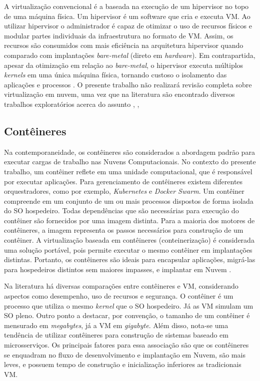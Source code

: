 A virtualização convencional é a baseada na execução de um hipervisor no topo de uma máquina física. Um hipervisor é um software que cria e executa \ac{VM}. Ao utilizar hipervisor o administrador é capaz de otimizar o uso de recursos físicos e modular partes individuais da infraestrutura no formato de \ac{VM}. Assim, os recursos são consumidos com mais eficiência na arquitetura hipervisor quando comparado com implantações \textit{bare-metal} (direto em \textit{hardware}). Em contrapartida, apesar da otimização em relação ao \textit{bare-metal}, o hipervisor executa múltiplos \textit{kernels} em uma única máquina física, tornando custoso o isolamento das aplicações e processos \cite{scheepers2014virtualization}.
%
O presente trabalho não realizará revisão completa sobre virtualização em nuvem, uma vez que na literatura são encontrado diversos trabalhos exploratórios acerca do assunto \cite{Assuno}, \cite{lu2014cloud}, \cite{aceto2013cloud}

\subsection{Contêineres}
Na contemporaneidade, os contêineres são considerados a abordagem padrão para executar cargas de trabalho nas Nuvens Computacionais. No contexto do presente trabalho, um contêiner reflete em uma unidade computacional, que é responsável por executar aplicações. Para gerenciamento de contêineres existem diferentes orquestradores, como por exemplo, \textit{Kubernetes} e \textit{Docker Swarm}.
%
Um contêiner compreende em um conjunto de um ou mais processos dispostos de forma isolada do \ac{SO} hospedeiro. Todas dependências que são necessárias para execução do contêiner são fornecidos por uma imagem distinta. Para a maioria dos motores de contêineres, a imagem representa os passos necessários para construção de um contêiner. A virtualização baseada em contêineres (conteinerização) é considerada uma solução portável, pois permite executar o mesmo contêiner em implantações distintas. Portanto, os contêineres são ideais para encapsular aplicações, migrá-las para hospedeiros distintos sem maiores impasses, e implantar em Nuvem \cite{Redhat-lxc}.

Na literatura há diversas comparações entre contêineres e \ac{VM}, considerando aspectos como desempenho, uso de recursos e segurança. O contêiner é um processo que utiliza o mesmo \textit{kernel} que o \ac{SO} hospedeiro. Já as \ac{VM} simulam um \ac{SO} pleno. Outro ponto a destacar, por convenção, o tamanho de um contêiner é mensurado em \textit{megabytes}, já a \ac{VM} em \textit{gigabyte}. Além disso, nota-se uma tendência de utilizar contêineres para construção de sistemas baseado em microsserviços. Os principais fatores para essa associação são que os contêineres se enquadram no fluxo de desenvolvimento e implantação em Nuvem, são mais leves, e possuem tempo de construção e inicialização inferiores as tradicionais \ac{VM}.

